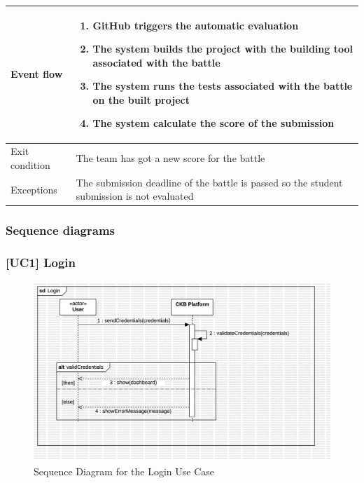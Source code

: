 \begin{enumerate}[label=UC\arabic*:]
\begin{tabular}{|p{3cm}|p{8cm}|}
        \hline
        Event flow &
        \begin{enumerate}[label=\arabic*.]
            \item GitHub triggers the automatic evaluation
            \item The system builds the project with the building tool associated with the battle
            \item The system runs the tests associated with the battle on the built project
            \item The system calculate the score of the submission
        \end{enumerate} \\
        \hline
        Exit condition & The team has got a new score for the battle \\
        \hline
        Exceptions & The submission deadline of the battle is passed so the student submission is not evaluated \\
        \hline
    \end{tabular}
\end{enumerate}

\subsubsection{Sequence diagrams}
\subsubsection*{[UC1] Login}
\begin{figure}[H]
    \centering
    \includegraphics[width=\textwidth]{Diagrams/UC1SequenceDiagram.jpg}
    \caption{Sequence Diagram for the Login Use Case}
    \label{fig:sequence-diagram-login}
\end{figure}

